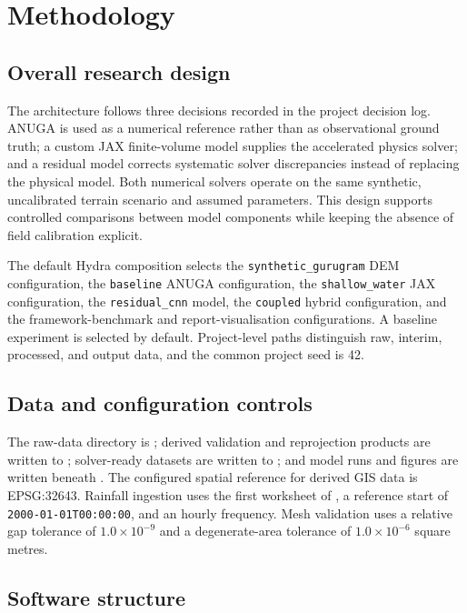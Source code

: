\section{Methodology}
\label{sec:methodology}

\subsection{Overall research design}

The architecture follows three decisions recorded in the project decision
log.  ANUGA is used as a numerical reference rather than as observational
ground truth; a custom JAX finite-volume model supplies the accelerated physics
solver; and a residual model corrects systematic solver discrepancies instead
of replacing the physical model.  Both numerical solvers operate on the same
synthetic, uncalibrated terrain scenario and assumed parameters.  This design
supports controlled comparisons between model components while keeping the
absence of field calibration explicit.

The default Hydra composition selects the
\texttt{synthetic\_gurugram} DEM configuration, the
\texttt{baseline} ANUGA configuration, the
\texttt{shallow\_water} JAX configuration, the
\texttt{residual\_cnn} model, the \texttt{coupled} hybrid configuration, and
the framework-benchmark and report-visualisation configurations.  A baseline
experiment is selected by default.  Project-level paths distinguish raw,
interim, processed, and output data, and the common project seed is 42.

\subsection{Data and configuration controls}

The raw-data directory is ; derived validation and reprojection
products are written to ; solver-ready datasets are written
to ; and model runs and figures are written beneath
.  The configured spatial reference for derived GIS data is
EPSG:32643.  Rainfall ingestion uses the first worksheet of
, a reference start of
\texttt{2000-01-01T00:00:00}, and an hourly frequency.  Mesh validation uses a
relative gap tolerance of \(1.0\times10^{-9}\) and a degenerate-area tolerance
of \(1.0\times10^{-6}\) square metres.

\subsection{Software structure}

